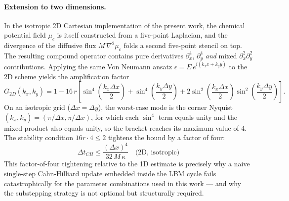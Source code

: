 \paragraph{Extension to two dimensions.} In the isotropic 2D Cartesian implementation of the present work, the chemical potential field $\mu_c$ is itself constructed from a five-point Laplacian, and the divergence of the diffusive flux $M\,\nabla^2\mu_c$ folds a second five-point stencil on top.
The resulting compound operator contains pure derivatives $\partial^4_x$, $\partial^4_y$ \emph{and} mixed $\partial^2_x\partial^2_y$ contributions.
Applying the same Von Neumann ansatz $\epsilon = E\,e^{i(k_x x + k_y y)}$ to the 2D scheme yields the amplification factor
\begin{equation}
    G_{2D}(k_x, k_y) = 1 - 16\,r\left[\sin^4\!\!\left(\frac{k_x\Delta x}{2}\right) + \sin^4\!\!\left(\frac{k_y\Delta y}{2}\right) + 2\sin^2\!\!\left(\frac{k_x\Delta x}{2}\right)\sin^2\!\!\left(\frac{k_y\Delta y}{2}\right)\right].
\end{equation}
On an isotropic grid ($\Delta x = \Delta y$), the worst-case mode is the corner Nyquist $(k_x, k_y) = (\pi/\Delta x, \pi/\Delta x)$, for which each $\sin^4$ term equals unity and the mixed product also equals unity, so the bracket reaches its maximum value of $4$.
The stability condition $16r\cdot 4 \leq 2$ tightens the bound by a factor of four:
\begin{equation}
    \boxed{\;\Delta t_{CH} \leq \frac{(\Delta x)^4}{32\,M\,\kappa} \quad \text{(2D, isotropic)}\;}
\end{equation}
This factor-of-four tightening relative to the 1D estimate is precisely why a naive single-step Cahn-Hilliard update embedded inside the LBM cycle fails catastrophically for the parameter combinations used in this work --- and why the substepping strategy is not optional but structurally required.

